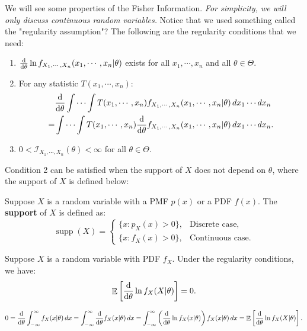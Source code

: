 \documentclass{huhtakm-template-book-v2}
\DeclareMathOperator{\E}{\mathbb{E}}
\DeclareMathOperator{\supp}{supp}
\begin{document}
    We will see some properties of the Fisher Information. \textit{For simplicity, we will only discuss continuous random variables.} Notice that we used something called the "regularity assumption"? The following are the regularity conditions that we need:
    \begin{enumerate}
        \item $\odv*{}{\theta} \ln{f_{X_{1}, \cdots, X_{n}}}(x_{1}, \cdots, x_{n} | \theta)$ exists for all $x_{1}, \cdots, x_{n}$ and all $\theta \in \Theta$.
        \item For any statistic $T(x_{1}, \cdots, x_{n})$:
        \begin{align*}
            &\odv*{}{\theta} \int \cdots \int T(x_{1}, \cdots, x_{n}) f_{X_{1}, \cdots, X_{n}}(x_{1}, \cdots, x_{n} | \theta) \, dx_{1} \cdots dx_{n}\\
            =& \int \cdots \int T(x_{1}, \cdots, x_{n}) \odv*{}{\theta} f_{X_{1}, \cdots, X_{n}}(x_{1}, \cdots, x_{n} | \theta) \, dx_{1} \cdots dx_{n}.
        \end{align*}
        \item $0 < \mathcal{I}_{X_{1}, \cdots, X_{n}}(\theta) < \infty$ for all $\theta \in \Theta$.
    \end{enumerate}
    Condition 2 can be satisfied when the support of $X$ does not depend on $\theta$, where the support of $X$ is defined below:
    \begin{defn}
        Suppose $X$ is a random variable with a PMF $p(x)$ or a PDF $f(x)$. The \textbf{support} of $X$ is defined as:
        \begin{equation*}
            \supp(X) = \begin{cases}
                \{x : p_{X}(x) > 0\}, &\text{Discrete case},\\
                \{x : f_{X}(x) > 0\}, &\text{Continuous case}.
            \end{cases}
        \end{equation*}
    \end{defn}
    \begin{lem}
        \label{Chapter 2 (Lemma) Expectation of Fisher Information but with first moment is zero}
        Suppose $X$ is a random variable with PDF $f_{X}$. Under the regularity conditions, we have:
        \begin{equation*}
            \E\left[\odv*{}{\theta} \ln{f_{X}(X | \theta)}\right] = 0.
        \end{equation*}
    \end{lem}
    \begin{proofing}
        \begin{equation*}
            0 = \odv*{}{\theta} \intinfty f_{X}(x | \theta) \, dx = \intinfty \odv*{}{\theta} f_{X}(x | \theta) \, dx = \intinfty \left(\odv*{}{\theta} \ln{f_{X}(x | \theta)}\right) f_{X}(x | \theta) \, dx = \E\left[\odv*{}{\theta} \ln{f_{X}(X | \theta)}\right].
        \end{equation*}
    \end{proofing}
\end{document}
